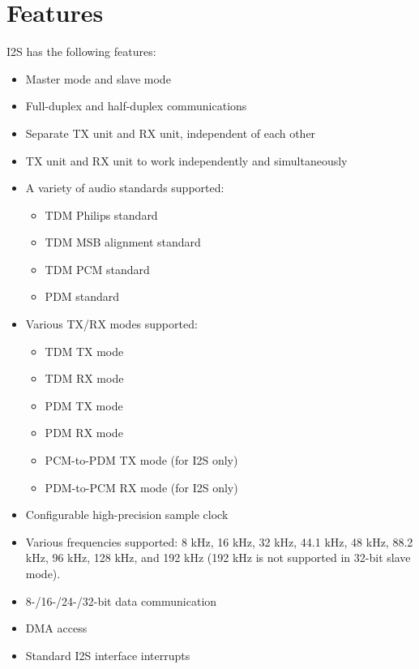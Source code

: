 \documentclass[main\_\_CN.tex]{subfiles}
\begin{document}
\section{Features}

I2S has the following features:

\begin{itemize}
    \item Master mode and slave mode
    \item Full-duplex and half-duplex communications
    \item Separate TX unit and RX unit, independent of each other
    \item TX unit and RX unit to work independently and simultaneously
    \item A variety of audio standards supported:
    \begin{itemize}
        \item TDM Philips standard
        \item TDM MSB alignment standard
        \item TDM PCM standard
        \item PDM standard
    \end{itemize}
    \item Various TX/RX modes supported:
        \begin{itemize}
        \item TDM TX mode
        \item TDM RX mode
        \item PDM TX mode
        \item PDM RX mode
        \item PCM-to-PDM TX mode (for I2S only)
        \item PDM-to-PCM RX mode (for I2S only)
    \end{itemize}
    \item Configurable high-precision sample clock
    \item Various frequencies supported: 8 kHz, 16 kHz, 32 kHz, 44.1 kHz, 48 kHz, 88.2 kHz, 96 kHz, 128 kHz, and 192 kHz (192 kHz is not supported in 32-bit slave mode).
    \item 8-/16-/24-/32-bit data communication
    \item DMA access
    \item Standard I2S interface interrupts
\end{itemize}
\end{document}
